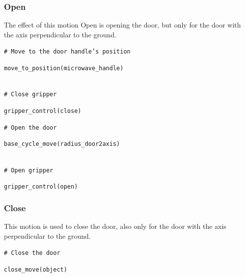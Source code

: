 \documentclass[letterpaper,conference]{ieeeconf}
\begin{document}
\subsubsection{Open}
The effect of this motion Open is opening the door, but only for the door with the axis perpendicular to the ground.
\begin{codebox}
\textcolor{codegreen}{\footnotesize \texttt{\# Move to the door handle's position}}\\
\colorbox{codeblue}{%
    \begin{minipage}{\dimexpr\textwidth-6pt\relax}
        \footnotesize \texttt{move\_to\_position(microwave\_handle)}
    \end{minipage}%
}\\
\textcolor{codegreen}{\footnotesize \texttt{\# Close gripper}}\\
\colorbox{codeblue}{%
    \begin{minipage}{\dimexpr\textwidth-6pt\relax}
        \footnotesize \texttt{gripper\_control(close)}
    \end{minipage}%
}
\textcolor{codegreen}{\footnotesize \texttt{\# Open the door}}\\
\colorbox{codeblue}{%
    \begin{minipage}{\dimexpr\textwidth-6pt\relax}
        \footnotesize \texttt{base\_cycle\_move(radius\_door2axis)}
    \end{minipage}%
}\\
\textcolor{codegreen}{\footnotesize \texttt{\# Open gripper}}\\
\colorbox{codeblue}{%
    \begin{minipage}{\dimexpr\textwidth-6pt\relax}
        \footnotesize \texttt{gripper\_control(open)}
    \end{minipage}%
}
\end{codebox}
\vspace{-1.5mm}
\subsubsection{Close}
This motion is used to close the door, also only for the door with the axis perpendicular to the ground.
\begin{codebox}
\textcolor{codegreen}{\footnotesize \texttt{\# Close the door}}\\
\colorbox{codeblue}{%
    \begin{minipage}{\dimexpr\textwidth-6pt\relax}
        \footnotesize \texttt{close\_move(object)}
    \end{minipage}%
}
\end{codebox}
\vspace{-1.5mm}
\end{document}

